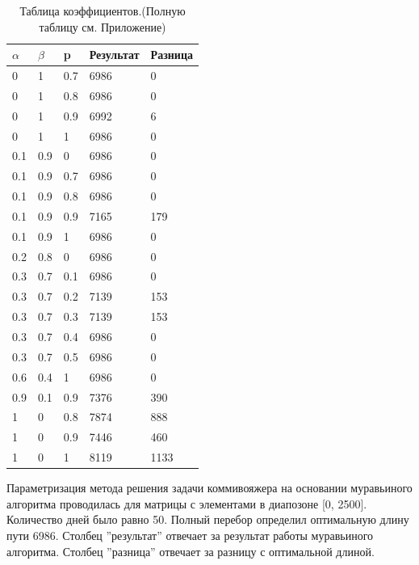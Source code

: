 \documentclass[12pt,a4paper]{report}
\begin{document}
\begin{table}[ht!]
	\centering
	\caption{Таблица коэффициентов.(Полную таблицу см. Приложение)}
	\label{table:ref4}
	\begin{tabular}{ | l | l | l | l | l |}
		\hline
		$\alpha$ & $\beta$ & p   & Результат & Разница \\
		\hline
		0        & 1       & 0.7 & 6986      & 0       \\
		0        & 1       & 0.8 & 6986      & 0       \\
		0        & 1       & 0.9 & 6992      & 6       \\
		0        & 1       & 1   & 6986      & 0       \\
		0.1      & 0.9     & 0   & 6986      & 0       \\
		0.1      & 0.9     & 0.7 & 6986      & 0       \\
		0.1      & 0.9     & 0.8 & 6986      & 0       \\
		0.1      & 0.9     & 0.9 & 7165      & 179     \\
		0.1      & 0.9     & 1   & 6986      & 0       \\
		0.2      & 0.8     & 0   & 6986      & 0       \\
		0.3      & 0.7     & 0.1 & 6986      & 0       \\
		0.3      & 0.7     & 0.2 & 7139      & 153     \\
		0.3      & 0.7     & 0.3 & 7139      & 153     \\
		0.3      & 0.7     & 0.4 & 6986      & 0       \\
		0.3      & 0.7     & 0.5 & 6986      & 0       \\
		0.6      & 0.4     & 1   & 6986      & 0       \\
		0.9      & 0.1     & 0.9 & 7376      & 390     \\
			
		1        & 0       & 0.8 & 7874      & 888     \\
		1        & 0       & 0.9 & 7446      & 460     \\
		1        & 0       & 1   & 8119      & 1133    \\
		\hline
	\end{tabular}
\end{table}

\newpage

Параметризация метода решения задачи коммивояжера
на основании муравьиного алгоритма проводилась для матрицы с
элементами в диапозоне [0, 2500].
Количество дней было равно 50.
Полный перебор определил оптимальную длину пути 6986.
Столбец ''результат'' отвечает за результат работы муравьиного алгоритма.
Столбец ''разница'' отвечает за разницу с оптимальной длиной.
\end{document}
